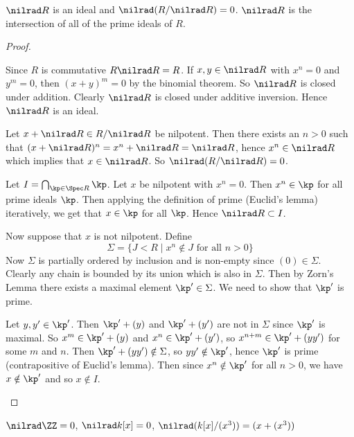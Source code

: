 \begin{prop}[0.12]
	\begin{enum}
		\io $\nilrad R$ is an ideal and $\nilrad(R/\nilrad R)=0$.
		\io $\nilrad R$ is the intersection of all of the prime ideals of $R$.
	\end{enum}
\end{prop}

\begin{proof}
	\begin{enum}
		\io Since $R$ is commutative $R \nilrad R = R$.
		If $x,y \in \nilrad R$ with $x^n=0$ and $y^m=0$, then $(x+y)^m=0$ by the binomial theorem.
		So $\nilrad R$ is closed under addition.
		Clearly $\nilrad R$ is closed under additive inversion.
		Hence $\nilrad R$ is an ideal.
		
		Let $x+\nilrad R \in R/\nilrad R$ be nilpotent.
		Then there exists an $n > 0$ such that $(x+\nilrad R)^n = x^n + \nilrad R = \nilrad R$, hence $x^n \in \nilrad R$ which implies that $x \in \nilrad R$.
		So $\nilrad(R/\nilrad R)=0$.
		
		\io Let $I = \bigcap_{\kp \in \Spec R} \kp$.
		Let $x$ be nilpotent with $x^n=0$.
		Then $x^n \in \kp$ for all prime ideals $\kp$.
		Then applying the definition of prime (Euclid's lemma) iteratively, we get that $x \in \kp$ for all $\kp$.
		Hence $\nilrad R \subset I$.
		
		Now suppose that $x$ is not nilpotent.
		Define
		\[\Sigma = \{J<R \mid x^n \notin J \text{ for all } n>0\}\]
		Now $\Sigma$ is partially ordered by inclusion and is non-empty since $(0) \in \Sigma$.
		Clearly any chain is bounded by its union which is also in $\Sigma$.
		Then by Zorn's Lemma there exists a maximal element $\kp' \in \Sigma$.
		We need to show that $\kp'$ is prime.
		
		Let $y,y' \in \kp'$.
		Then $\kp'+(y)$ and $\kp'+(y')$ are not in $\Sigma$ since $\kp'$ is maximal.
		So $x^m \in \kp'+(y)$ and $x^n \in \kp' + (y')$, so $x^{n+m} \in \kp' + (yy')$ for some $m$ and $n$.
		Then $\kp' + (yy') \notin \Sigma$, so $yy' \notin \kp'$, hence $\kp'$ is prime (contrapositive of Euclid's lemma).
		Then since $x^n \notin \kp'$ for all $n>0$, we have $x \notin \kp'$ and so $x \notin I$.
		\qedhere
	\end{enum}
\end{proof}

\begin{exam}
	$\nilrad \ZZ = 0$, $\nilrad k[x] = 0$, $\nilrad(k[x]/(x^3))=(x+(x^3))$
\end{exam}

